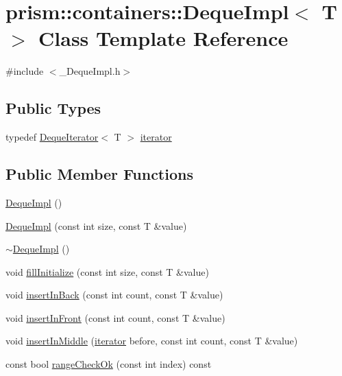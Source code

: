 \hypertarget{classprism_1_1containers_1_1_deque_impl}{}\section{prism\+:\+:containers\+:\+:Deque\+Impl$<$ T $>$ Class Template Reference}
\label{classprism_1_1containers_1_1_deque_impl}


{\ttfamily \#include $<$\+\_\+\+Deque\+Impl.\+h$>$}

\subsection*{Public Types}
\begin{DoxyCompactItemize}
\item 
typedef \hyperlink{classprism_1_1containers_1_1_deque_iterator}{Deque\+Iterator}$<$ T $>$ \hyperlink{classprism_1_1containers_1_1_deque_impl_a6c9e3d37535525f642b08ef6b5d1264c}{iterator}
\end{DoxyCompactItemize}
\subsection*{Public Member Functions}
\begin{DoxyCompactItemize}
\item 
\hyperlink{classprism_1_1containers_1_1_deque_impl_a70fd244e2fc130be6dd763ac38c499ca}{Deque\+Impl} ()
\item 
\hyperlink{classprism_1_1containers_1_1_deque_impl_adde6559ef53435ca6933a81ad8c81f12}{Deque\+Impl} (const int size, const T \&value)
\item 
\hyperlink{classprism_1_1containers_1_1_deque_impl_a48187aae0e744da833775e102612bd4a}{$\sim$\+Deque\+Impl} ()
\item 
void \hyperlink{classprism_1_1containers_1_1_deque_impl_ad725e7d96204a8ee496da19fba1fb430}{fill\+Initialize} (const int size, const T \&value)
\item 
void \hyperlink{classprism_1_1containers_1_1_deque_impl_ab4be8ca79049392ebb9a4f2016e93c94}{insert\+In\+Back} (const int count, const T \&value)
\item 
void \hyperlink{classprism_1_1containers_1_1_deque_impl_a051f0ccfc8455c8054f23b7ea44ff102}{insert\+In\+Front} (const int count, const T \&value)
\item 
void \hyperlink{classprism_1_1containers_1_1_deque_impl_ada2bf2e92188c04c82eae7b0a4b233d8}{insert\+In\+Middle} (\hyperlink{classprism_1_1containers_1_1_deque_impl_a6c9e3d37535525f642b08ef6b5d1264c}{iterator} before, const int count, const T \&value)
\item 
const bool \hyperlink{classprism_1_1containers_1_1_deque_impl_a91e7540943a4a7c852d469e2a142c30b}{range\+Check\+Ok} (const int index) const 
\end{DoxyCompactItemize}
